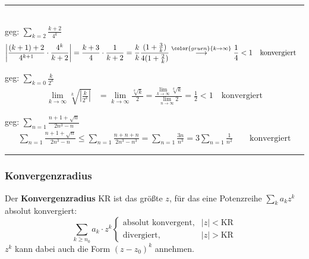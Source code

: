 \documentclass{article}
\newcommand{\commentmath}[1]{{\color{gruen}{#1}}}
\begin{document}
\vspace{0.5cm}

{\color{blue}
\hrule
	\\
	geg: $\sum_{k = 2} \frac{k+2}{4^k}$
		\begin{align*}
			\left|\frac{(k + 1) + 2}{4^{k+1}} \cdot \frac{4^k}{k + 2}\right| &= \frac{k + 3}{4} \cdot \frac{1}{k + 2} = \frac{k}{k}\frac{(1 + \frac{3}{k})}{4(1 + \frac{2}{k})} \stackrel{\commentmath{k\rightarrow \infty}}{\longrightarrow} \frac{1}{4} < 1 \quad\text{konvergiert}
		\end{align*}				


	
	geg: $\sum_{k = 0} \frac{k}{2^k}$
		\begin{align*}
			\lim\limits_{k\rightarrow \infty} \sqrt[k]{\left| \frac{k}{2^k} \right|} &= \lim\limits_{k\rightarrow \infty} \frac{\sqrt[k]{k}}{2} = \frac{\lim\limits_{k\rightarrow \infty} \sqrt[k]{k}}{\lim\limits_{n\rightarrow \infty} 2} = \frac{1}{2} < 1 \quad\text{konvergiert}
		\end{align*}


	
	geg: $\sum_{n=1}\frac{n + 1 + \sqrt{n}}{2n^3 - n}$
		\begin{align*}
			\sum_{n=1}\frac{n + 1 + \sqrt{n}}{2n^3 - n} \leq \sum_{n=1}\frac{n + n + n}{2n^3 - n^3} = \sum_{n=1}\frac{3n}{n^3} = 3\sum_{n=1}\frac{1}{n^2} \qquad\text{konvergiert}
		\end{align*}
\hrule
}


\newpage


\subsubsection{Konvergenzradius}
Der \textbf{Konvergenzradius} KR ist das größte $z$, für das eine Potenzreihe $\sum_k a_k z^k$ absolut konvergiert:
	\begin{equation}
		\sum_{k\geq n_0} a_k \cdot z^k
		\begin{cases}
			\text{absolut konvergent}, & |z| < \text{KR}\\
			\text{divergiert}, & |z| > \text{KR}
		\end{cases}
	\end{equation}
\textcolor{gruen}{$z^k$ kann dabei auch die Form $(z - z_0)^k$ annehmen.}
\end{document}
